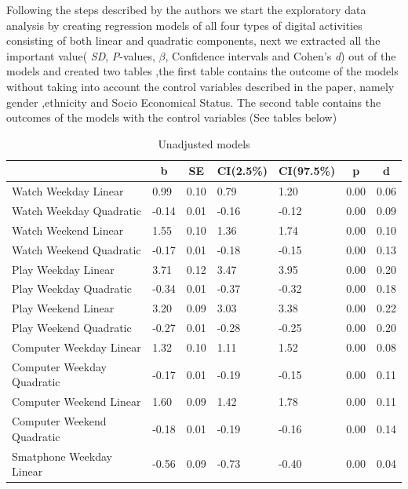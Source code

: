 \documentclass[floatsintext,man]{apa6}
\theoremstyle{definition}
\theoremstyle{definition}
\theoremstyle{definition}
\theoremstyle{remark}
\begin{document}
Following the steps described by the authors we start the exploratory
data analysis by creating regression models of all four types of digital
activities consisting of both linear and quadratic components, next we
extracted all the important value( \emph{SD}, \emph{P}-values,
\emph{\(\beta\)}, Confidence intervals and Cohen's \emph{d}) out of the
models and created two tables ,the first table contains the outcome of
the models without taking into account the control variables described
in the paper, namely gender ,ethnicity and Socio Economical Status. The
second table contains the outcomes of the models with the control
variables (See tables below)

\begin{table}[tbp]
\begin{center}
\begin{threeparttable}
\caption{\label{tab:unnamed-chunk-1}Unadjusted models}
\small{
\begin{tabular}{lllllll}
\toprule
 & \multicolumn{1}{c}{b} & \multicolumn{1}{c}{SE} & \multicolumn{1}{c}{CI(2.5\%)} & \multicolumn{1}{c}{CI(97.5\%)} & \multicolumn{1}{c}{p} & \multicolumn{1}{c}{d}\\
\midrule
Watch Weekday Linear & 0.99 & 0.10 & 0.79 & 1.20 & 0.00 & 0.06\\
Watch Weekday Quadratic & -0.14 & 0.01 & -0.16 & -0.12 & 0.00 & 0.09\\
Watch Weekend Linear & 1.55 & 0.10 & 1.36 & 1.74 & 0.00 & 0.10\\
Watch Weekend Quadratic & -0.17 & 0.01 & -0.18 & -0.15 & 0.00 & 0.13\\
Play Weekday Linear & 3.71 & 0.12 & 3.47 & 3.95 & 0.00 & 0.20\\
Play Weekday Quadratic & -0.34 & 0.01 & -0.37 & -0.32 & 0.00 & 0.18\\
Play Weekend Linear & 3.20 & 0.09 & 3.03 & 3.38 & 0.00 & 0.22\\
Play Weekend Quadratic & -0.27 & 0.01 & -0.28 & -0.25 & 0.00 & 0.20\\
Computer Weekday Linear & 1.32 & 0.10 & 1.11 & 1.52 & 0.00 & 0.08\\
Computer Weekday Quadratic & -0.17 & 0.01 & -0.19 & -0.15 & 0.00 & 0.11\\
Computer Weekend Linear & 1.60 & 0.09 & 1.42 & 1.78 & 0.00 & 0.11\\
Computer Weekend Quadratic & -0.18 & 0.01 & -0.19 & -0.16 & 0.00 & 0.14\\
Smatphone Weekday Linear & -0.56 & 0.09 & -0.73 & -0.40 & 0.00 & 0.04\\

\end{tabular}}
\end{threeparttable}
\end{center}
\end{table}
\end{document}
